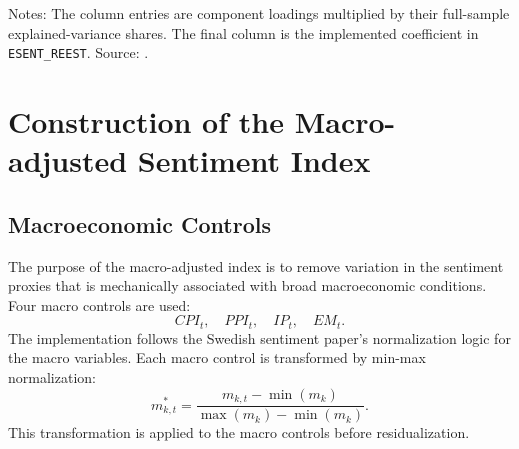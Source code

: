 \documentclass[12pt]{article}
\begin{document}
\begin{table}[htbp]
\centering
\caption{Weighted Score Coefficients for the Preliminary Index}
\label{tab:esent_coefficients}
\begin{minipage}{0.95\textwidth}
\footnotesize
Notes: The column entries are component loadings multiplied by their full-sample explained-variance shares. The final column is the implemented coefficient in \texttt{ESENT\_REEST}. Source: .
\end{minipage}
\end{table}

\section{Construction of the Macro-adjusted Sentiment Index}

\subsection{Macroeconomic Controls}

The purpose of the macro-adjusted index is to remove variation in the sentiment proxies that is mechanically associated with broad macroeconomic conditions. Four macro controls are used:
\[
CPI_t,\quad PPI_t,\quad IP_t,\quad EM_t.
\]
The implementation follows the Swedish sentiment paper's normalization logic for the macro variables. Each macro control is transformed by min-max normalization:
\[
m^{*}_{k,t} = \frac{m_{k,t} - \min(m_k)}{\max(m_k)-\min(m_k)}.
\]
This transformation is applied to the macro controls before residualization.
\end{document}
